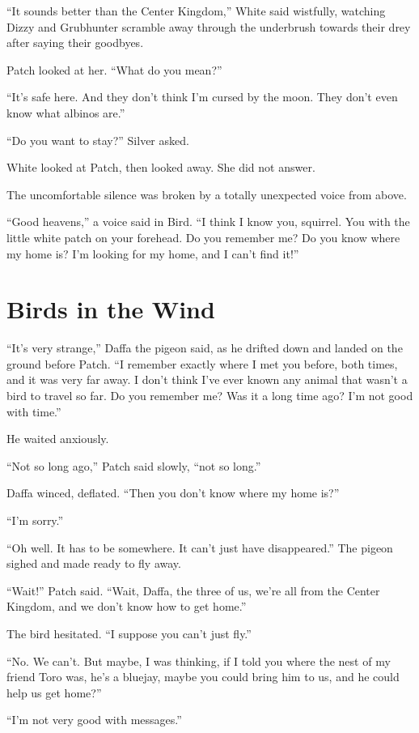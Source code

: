 \documentclass[ebook,oneside,openany,12pt]{memoir}
\begin{document}
“It sounds better than the Center Kingdom,” White said wistfully,
watching Dizzy and Grubhunter scramble away through the underbrush
towards their drey after saying their goodbyes.

Patch looked at her. “What do you mean?”

“It’s safe here. And they don’t think I’m cursed by the moon. They
don’t even know what albinos are.”

“Do you want to stay?” Silver asked.

White looked at Patch, then looked away. She did not answer.

The uncomfortable silence was broken by a totally unexpected voice
from above.

“Good heavens,” a voice said in Bird. “I think I know you,
squirrel. You with the little white patch on your forehead. Do you
remember me? Do you know where my home is? I’m looking for my home,
and I can’t find it!”


\section{Birds in the Wind}

“It’s very strange,” Daffa the pigeon said, as he drifted down and
landed on the ground before Patch. “I remember exactly where I met you
before, both times, and it was very far away. I don’t think I’ve ever
known any animal that wasn’t a bird to travel so far. Do you remember
me? Was it a long time ago? I’m not good with time.”

He waited anxiously.

“Not so long ago,” Patch said slowly, “not so long.”

Daffa winced, deflated. “Then you don’t know where my home is?”

“I’m sorry.”

“Oh well. It has to be somewhere. It can’t just have disappeared.”
The pigeon sighed and made ready to fly away.

“Wait!” Patch said. “Wait, Daffa, the three of us, we’re all from the
Center Kingdom, and we don’t know how to get home.”

The bird hesitated. “I suppose you can’t just fly.”

“No. We can’t. But maybe, I was thinking, if I told you where the nest
of my friend Toro was, he’s a bluejay, maybe you could bring him to
us, and he could help us get home?”

“I’m not very good with messages.”
\end{document}
